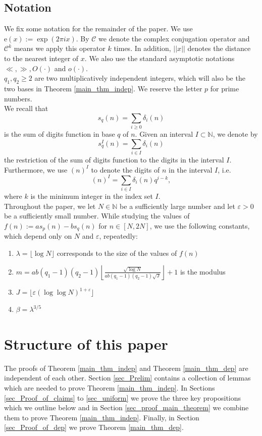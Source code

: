 \documentclass[12pt]{amsart}
\renewcommand{\geq}{\geqslant}
\theoremstyle{definition}
\numberwithin{equation}{section}
\newcommand\NN{\mathbb{N}}
\numberwithin{equation}{section}
\begin{document}
\subsection{Notation}
We fix some notation for the remainder of the paper. We use $\mathrm{e}(x):=\exp (2\pi i x)$. By $\mathcal{C}$ we denote the complex conjugation operator and  $\mathcal{C}^k$ means we apply this operator $k$ times. In addition, $||x||$ denotes the distance to the nearest integer of $x$. We also use the standard asymptotic notations $\ll, \gg, O(\cdot)$ and $o(\cdot)$.\\
$q_1,q_2\geq 2$ are two multiplicatively independent integers, which will also be the two bases in Theorem \ref{main_thm_indep}. We reserve the letter $p$ for prime numbers.\\
We recall that 
\[
	s_q(n) = \sum_{i\geq0}\delta_i(n)
\] 
is the sum of digits function in base $q$ of $n$. Given an interval $I \subset \NN$, we denote by
\[
	s_q^I(n) = \sum_{i\in I} \delta_i(n)
\]
the restriction of the sum of digits function to the digits in the interval $I$. Furthermore, we use $(n)^I$ to denote the digits of $n$ in the interval $I$, i.e.
\[
    (n)^I = \sum_{i\in I} \delta_i(n)q^{i-k},
\]
where $k$ is the minimum integer in the index set $I$.\\
Throughout the paper, we let $N\in \NN$ be a sufficiently large number and let $\varepsilon>0$ be a sufficiently small number. While studying the values of $f(n):=as_p(n)-bs_q(n)$ for $n\in [N,2N]$, we use the following constants, which depend only on $N$ and $\varepsilon$, repeatedly:
\begin{enumerate}
	\item $\lambda = \lfloor \log N \rfloor$ corresponds to the size of the values of $f(n)$
	\item $m = ab(q_1-1)(q_2-1)\left\lfloor\frac{\sqrt{\log N}}{ab(q_1-1)(q_2-1)\sqrt{J}}\right\rfloor+1$ is the modulus
	\item $J=\lfloor \varepsilon (\log \log N)^{1+\varepsilon} \rfloor$
	\item $\beta= \lambda^{3/5}$
\end{enumerate}

\section{Structure of this paper}
The proofs of Theorem \ref{main_thm_indep} and Theorem \ref{main_thm_dep} are independent of each other. Section \ref{sec_Prelim} contains a collection of lemmas which are needed to prove Theorem \ref{main_thm_indep}. In Sections \ref{sec_Proof_of_claims} to \ref{sec_uniform} we prove the three key propositions which we outline below and in Section \ref{sec_proof_main_theorem} we combine them to prove Theorem \ref{main_thm_indep}. Finally, in Section \ref{sec_Proof_of_dep} we prove Theorem \ref{main_thm_dep}.
\end{document}
